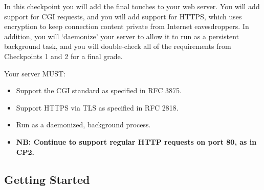 \label{sec:cp3}
In this checkpoint you will add the final touches to your web server. 
You will add support for CGI requests, and you will add support for HTTPS, which uses encryption to keep connection content private from Internet eavesdroppers.
In addition, you will `daemonize' your server to allow it to run as a persistent background task, and you will double-check all of the requirements from Checkpoints 1 and 2 for a final grade.

\vspace{5pt}
\noindent Your server MUST:
\begin{itemize}
  \item Support the CGI standard as specified in RFC 3875.
  \item Support HTTPS via TLS as specified in RFC 2818.
  \item Run as a daemonized, background process.
  \item {\bf NB: Continue to support regular HTTP requests on port 80, as in CP2.}
\end{itemize}

\subsection{Getting Started}

